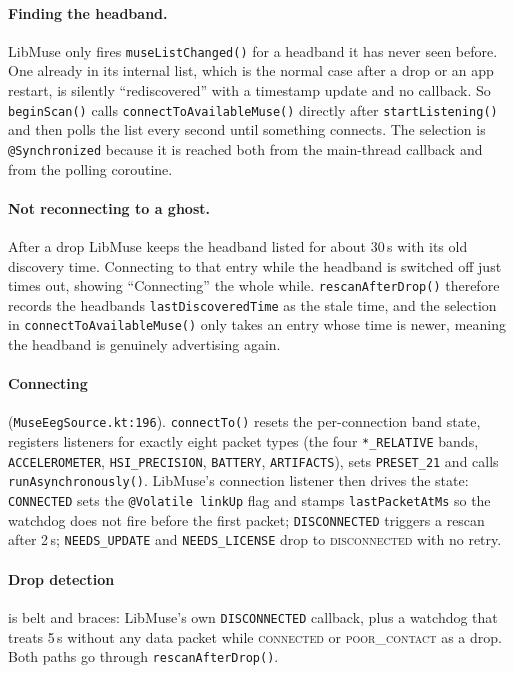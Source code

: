 \documentclass[10pt,a4paper]{article}
\newcommand{\file}[1]{\texttt{\small #1}}          %
\newcommand{\code}[1]{\texttt{#1}}                  %
\begin{document}
\paragraph{Finding the headband.} LibMuse only fires \code{museListChanged()} for a headband it has
never seen before. One already in its internal list, which is the normal case after a drop or an
app restart, is silently ``rediscovered'' with a timestamp update and no callback. So
\code{beginScan()} calls \code{connectToAvailableMuse()} directly after \code{startListening()}
and then polls the list every second until something connects. The selection is
\code{@Synchronized} because it is reached both from the main-thread callback and from the
polling coroutine.

\paragraph{Not reconnecting to a ghost.} After a drop LibMuse keeps the headband listed for
about 30\,s with its old discovery time. Connecting to that entry while the headband is switched
off just times out, showing ``Connecting'' the whole while. \code{rescanAfterDrop()} therefore
records the headband\textquotesingle s \code{lastDiscoveredTime} as the stale time, and the
selection in \code{connectToAvailableMuse()} only takes an entry whose time is newer, meaning the
headband is genuinely advertising again.

\paragraph{Connecting} (\file{MuseEegSource.kt:196}). \code{connectTo()} resets the per-connection
band state, registers listeners for exactly eight packet types (the four \code{*\_RELATIVE} bands,
\code{ACCELEROMETER}, \code{HSI\_PRECISION}, \code{BATTERY}, \code{ARTIFACTS}), sets
\code{PRESET\_21} and calls \code{runAsynchronously()}. LibMuse's connection listener then drives
the state: \code{CONNECTED} sets the \code{@Volatile linkUp} flag and stamps
\code{lastPacketAtMs} so the watchdog does not fire before the first packet;
\code{DISCONNECTED} triggers a rescan after 2\,s; \code{NEEDS\_UPDATE} and \code{NEEDS\_LICENSE}
drop to \textsc{disconnected} with no retry.

\paragraph{Drop detection} is belt and braces: LibMuse's own \code{DISCONNECTED} callback, plus a
watchdog that treats 5\,s without any data packet while \textsc{connected} or
\textsc{poor\_contact} as a drop. Both paths go through \code{rescanAfterDrop()}.
\end{document}
